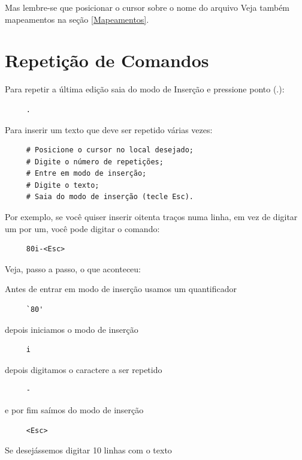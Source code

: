 \documentclass[10pt,a4paper,openany]{book}
\begin{document}
Mas lembre-se que posicionar o cursor sobre o nome do arquivo
Veja também mapeamentos na seção \ref{Mapeamentos}.

\chapter{Repetição de Comandos}\label{Repetição de comandos}

Para repetir a última edição saia do modo de Inserção e pressione ponto (.):

\begin{verbatim}
     .
\end{verbatim}

Para inserir um texto que deve ser repetido várias vezes:

\begin{verbatim}
     # Posicione o cursor no local desejado;
     # Digite o número de repetições;
     # Entre em modo de inserção;
     # Digite o texto;
     # Saia do modo de inserção (tecle Esc).
\end{verbatim}

Por exemplo, se você quiser inserir oitenta traços numa linha, em vez
de digitar um por um, você pode digitar o comando:

\begin{verbatim}
     80i-<Esc>
\end{verbatim}

Veja, passo a passo, o que aconteceu:

 Antes de entrar em modo de inserção usamos um quantificador

\begin{verbatim}
     `80'
\end{verbatim}

 depois iniciamos o modo de inserção

\begin{verbatim}
     i
\end{verbatim}

depois digitamos o caractere a ser repetido

\begin{verbatim}
     -
\end{verbatim}

e por fim saímos do modo de inserção

\begin{verbatim}
     <Esc>
\end{verbatim}

Se desejássemos digitar 10 linhas com o texto
\end{document}
